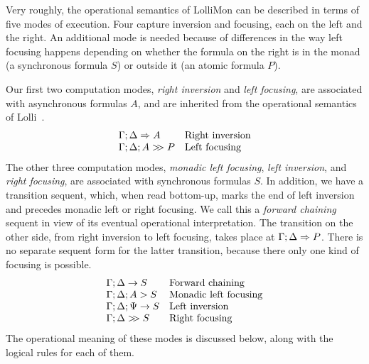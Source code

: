 \documentclass{sig-alt}
\begin{document}
Very roughly, the operational semantics of LolliMon can be described
in terms of five modes of execution.
Four capture inversion and focusing, each on the left and the right.
An additional mode is needed because of differences in the way
left focusing happens depending on whether the formula on the right
is in the monad (a synchronous formula $S$) or outside it (an atomic
formula $P$).

Our first two computation modes, \emph{right inversion} and
\emph{left focusing}, are associated with asynchronous
formulas $A$, and are inherited from the operational semantics of
Lolli~\cite{Hodas94ic}.
$$
\begin{array}{ll}
  \Gamma;\Delta\Rightarrow A & \hbox{Right inversion} \\
  \Gamma;\Delta;A\mathrel{>\!\! >}P & \hbox{Left focusing} \\
\end{array}
$$
%
The other three computation modes, \emph{monadic left focusing},
\emph{left inversion}, and \emph{right focusing}, are
associated with synchronous formulas $S$.  In addition, we
have a transition sequent, which, when read bottom-up,
marks the end of left inversion and precedes
monadic left or right focusing.  We call this a
\emph{forward chaining} sequent in view of its eventual
operational interpretation.  The transition on the other side, from right
inversion to left focusing, takes place at $\Gamma;\Delta\Rightarrow P$.
There is no separate sequent form for the latter transition, because there
only one kind of focusing is possible.
$$
\begin{array}{ll}
  \Gamma;\Delta\rightarrow S & \hbox{Forward chaining} \\
  \Gamma;\Delta;A\mathrel>S & \hbox{Monadic left focusing} \\
  \Gamma;\Delta;\Psi\rightarrow S & \hbox{Left inversion} \\
  \Gamma;\Delta\mathrel{>\!\! >}S & \hbox{Right focusing} \\
\end{array}
$$
The operational meaning of these modes is discussed below, along
with the logical rules for each of them.
\end{document}
